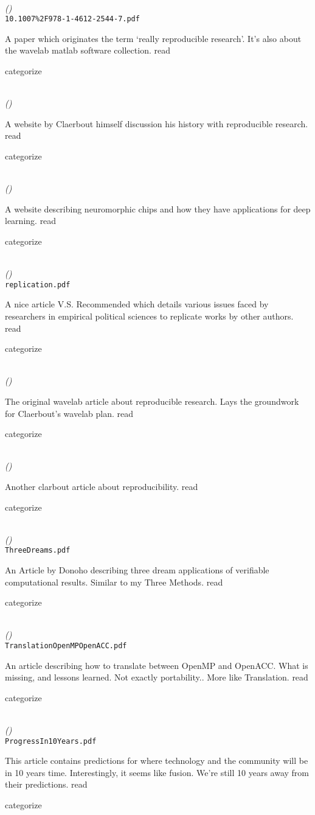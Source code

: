 \documentclass{article}
\newcommand{\Read}{
	\gls{read}
}
\newcommand{\categorize}{
	\gls{categorize}
}
\newenvironment{refdef}[2] {
	\noindent \textbf{\citetitle{#1}} \cite{#1}\\ \citejournalorbooktitle{#1} \textit{(\citeyear{#1})}\\ \texttt{#2} \vspace{0.2in} \par 
} {
\vspace{0.2in}
}
\begin{document}
\begin{refdef}{Buckheit1995}{10.1007\%2F978-1-4612-2544-7.pdf}
A paper which originates the term `really reproducible research'. It's also about the wavelab matlab software collection. \Read \categorize
\end{refdef}

\begin{refdef}{claerbout-reproducibility-website}{}
A website by Claerbout himself discussion his history with reproducible research. \Read \categorize
\end{refdef}

\begin{refdef}{neuromorphic-chips-webarticle}{}
A website describing neuromorphic chips and how they have applications for deep learning. \Read \categorize
\end{refdef}

\begin{refdef}{King95}{replication.pdf}
A nice article V.S. Recommended which details various issues faced by researchers in empirical political sciences to replicate works by other authors. \Read \categorize
\end{refdef}

\begin{refdef}{elec-doc-res-new-meaning}{}
The original wavelab article about reproducible research. Lays the groundwork for Claerbout's wavelab plan. \Read \categorize
\end{refdef}

\begin{refdef}{doi:10.1109/MCSE.2009.14}{}
Another clarbout article about reproducibility. \Read \categorize
\end{refdef}

\begin{refdef}{ThreeDreams}{ThreeDreams.pdf}
An Article by Donoho describing three dream applications of verifiable computational results. Similar to my Three Methods. \Read \categorize
\end{refdef}

\begin{refdef}{TranslationOpenMPOpenACC}{TranslationOpenMPOpenACC.pdf}
An article describing how to translate between OpenMP and OpenACC. What is missing, and lessons learned. Not exactly portability.. More like Translation. \Read \categorize
\end{refdef}

\begin{refdef}{ProgressIn10Years}{ProgressIn10Years.pdf}
This article contains predictions for where technology and the community will be in 10 years time. Interestingly, it seems like fusion. We're still 10 years away from their predictions. \Read \categorize
\end{refdef}
\end{document}
